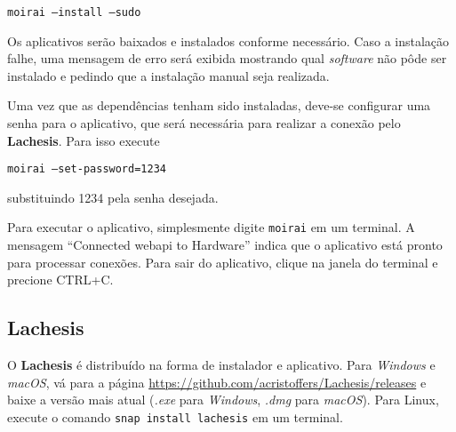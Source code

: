 \texttt{moirai --install --sudo}

Os aplicativos serão baixados e instalados conforme necessário. Caso a
instalação falhe, uma mensagem de erro será exibida mostrando qual
\textit{software} não pôde ser instalado e pedindo que a instalação manual seja
realizada.

Uma vez que as dependências tenham sido instaladas, deve-se configurar uma senha
para o aplicativo, que será necessária para realizar a conexão pelo
\textbf{Lachesis}. Para isso execute

\texttt{moirai --set-password=1234}

substituindo 1234 pela senha desejada.

Para executar o aplicativo, simplesmente digite \texttt{moirai} em um
terminal. A mensagem \enquote{Connected webapi to Hardware} indica que o
aplicativo está pronto para processar conexões. Para sair do aplicativo, clique
na janela do terminal e precione CTRL+C.

\subsection{Lachesis}%
\label{subsec:install-lachesis}

O \textbf{Lachesis} é distribuído na forma de instalador e aplicativo. Para
\textit{Windows} e \textit{macOS}, vá para a página
\url{https://github.com/acristoffers/Lachesis/releases} e baixe a versão mais
atual (\textit{.exe} para \textit{Windows}, \textit{.dmg} para \textit{macOS}).
Para Linux, execute o comando \texttt{snap install lachesis} em um
terminal.
